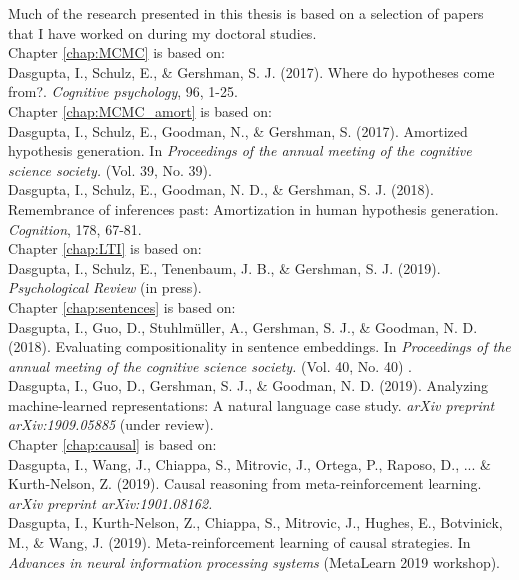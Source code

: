 
{\setlength{\parindent}{0em}
Much of the research presented in this thesis is based on a selection of papers that I have worked on during my doctoral studies.\\

Chapter \ref{chap:MCMC} is based on:
\\ Dasgupta, I., Schulz, E., \& Gershman, S. J. (2017). Where do hypotheses come from?. \textit{Cognitive psychology}, 96, 1-25.\\


Chapter \ref{chap:MCMC_amort} is based on:
\\ Dasgupta, I., Schulz, E., Goodman, N., \& Gershman, S. (2017). Amortized hypothesis generation.  In \textit{Proceedings of the annual meeting of the cognitive science society.} (Vol. 39, No. 39). 
\\ Dasgupta, I., Schulz, E., Goodman, N. D., \& Gershman, S. J. (2018). Remembrance of inferences past: Amortization in human hypothesis generation. \textit{Cognition}, 178, 67-81.\\


Chapter \ref{chap:LTI} is based on:
\\ Dasgupta, I., Schulz, E., Tenenbaum, J. B., \& Gershman, S. J. (2019). \textit{Psychological Review} (in press).\\


Chapter \ref{chap:sentences} is based on:
\\ Dasgupta, I., Guo, D., Stuhlmüller, A., Gershman, S. J., \& Goodman, N. D. (2018). Evaluating compositionality in sentence embeddings. In \textit{Proceedings of the annual meeting of the cognitive science society.} (Vol. 40, No. 40) .
\\ Dasgupta, I., Guo, D., Gershman, S. J., \& Goodman, N. D. (2019). Analyzing machine-learned representations: A natural language case study. \textit{arXiv preprint arXiv:1909.05885} (under review).\\


 Chapter \ref{chap:causal} is based on:
 \\ Dasgupta, I., Wang, J., Chiappa, S., Mitrovic, J., Ortega, P., Raposo, D., ... \& Kurth-Nelson, Z. (2019). Causal reasoning from meta-reinforcement learning. \textit{arXiv preprint arXiv:1901.08162.} 
\\ Dasgupta, I., Kurth-Nelson, Z., Chiappa, S., Mitrovic, J., Hughes, E., Botvinick, M., \& Wang, J. (2019). Meta-reinforcement learning of causal strategies.  In \textit{Advances in neural information processing systems} (MetaLearn 2019 workshop).\\
}
